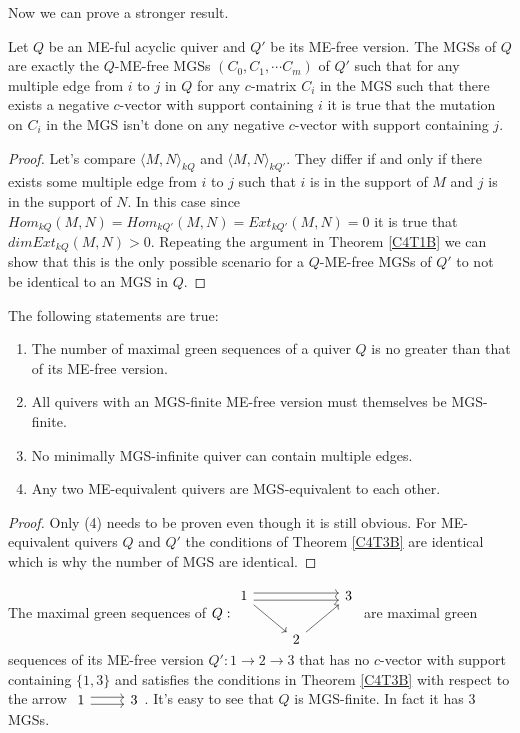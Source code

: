 \indent Now we can prove a stronger result.\\
\begin{theorem}\label{C4T3B}
Let $Q$ be an ME-ful acyclic quiver and $Q'$ be its ME-free version. The MGSs of $Q$ are exactly the $Q$-ME-free MGSs $(C_0,C_1,\cdots C_m)$ of $Q'$ such that for any multiple edge from $i$ to $j$ in $Q$ for any $c$-matrix $C_i$ in the MGS such that there exists a negative $c$-vector with support containing $i$ it is true that the mutation on $C_i$ in the MGS isn't done on any negative $c$-vector with support containing $j$.
\end{theorem}
\begin{proof}
Let's compare $\langle M, N \rangle_{kQ}$ and $\langle M, N \rangle_{kQ'}$. They differ if and only if there exists some multiple edge from $i$ to $j$ such that $i$ is in the support of $M$ and $j$ is in the support of $N$. In this case since $Hom_{kQ}(M,N) = Hom_{kQ'}(M,N)  = Ext_{kQ'}(M,N) = 0$ it is true that $dim Ext_{kQ}(M,N) > 0$. Repeating the argument in Theorem \ref{C4T1B} we can show that this is the only possible scenario for a $Q$-ME-free MGSs of $Q'$ to not be identical to an MGS in $Q$.
\end{proof}
\begin{corollary}\label{C4CB}
The following statements are true:
\begin{enumerate}
\item The number of maximal green sequences of a quiver $Q$ is no greater than that of its ME-free version.
\item All quivers with an MGS-finite ME-free version must themselves be MGS-finite.
\item No minimally MGS-infinite quiver can contain multiple edges.
\item Any two ME-equivalent quivers are MGS-equivalent to each other.
\end{enumerate}
\end{corollary}
\begin{proof}
\indent Only (4) needs to be proven even though it is still obvious. For ME-equivalent quivers $Q$ and $Q'$ the conditions of Theorem \ref{C4T3B} are identical which is why the number of MGS are identical.
\end{proof}
\begin{example}
The maximal green sequences of $Q: \begin{tikzcd}
1\righttwicedoublearrow\arrow[rd] &  & 3\\
 & 2\arrow[ur]
\end{tikzcd}$ are maximal green sequences of its ME-free version $Q': 1\to 2\to 3$ that has no $c$-vector with support containing $\{1,3\}$ and satisfies the conditions in Theorem \ref{C4T3B} with respect to the arrow $\begin{tikzcd} 1\rightdoublearrow & 3\end{tikzcd}$. It's easy to see that $Q$ is MGS-finite. In fact it has 3 MGSs.
\end{example}

